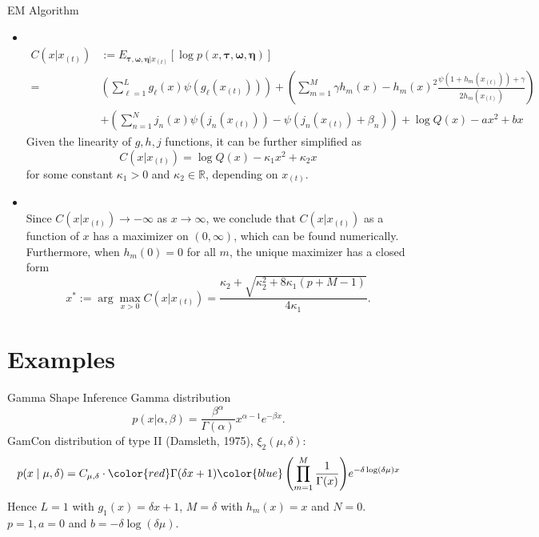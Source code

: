 \documentclass[10pt]{beamer}
\theoremstyle{remark}
\theoremstyle{definition}
\newcommand{\bcol}[1]{{\color{blue}{#1}}}
\begin{document}
\begin{frame}{EM Algorithm}
\footnotesize
\begin{itemize}
	\item \textbf{\bcol{Expectation Step:}}\\
	\begin{align*}
	C(x | x_{(t)}) &:= E_{\bm{\tau,\omega, \eta}|x_{(t)}}\left[\log p(x, \bm{\tau,\omega, \eta})\right] \\
	=& \left(\sum_{\ell=1}^L g_{\ell}(x) \psi(g_\ell(x_{(t)})) \right) + \left(\sum_{m=1}^M \gamma h_m(x) - h_m(x)^2 \frac{\psi(1+h_m(x_{(t)})) + \gamma}{2h_m(x_{(t)})} \right) \\
	&+ \left(\sum_{n=1}^N j_n(x)\psi(j_n(x_{(t)})) - \psi(j_n(x_{(t)}) + \beta_n) \right) + \log Q(x) -ax^2 + bx
	\end{align*}
	Given the linearity of $g, h, j$ functions, it can be further simplified as 
	\begin{equation*}
	C(x | x_{(t)}) = \log Q(x) - \kappa_1 x^2 + \kappa_2 x
	\end{equation*}
	for some constant $\kappa_1 > 0$ and $\kappa_2 \in \mathbb{R}$, depending on $x_{(t)}$.
	\item \textbf{\bcol{Maximization Step:}}\\
	Since $C(x | x_{(t)}) \rightarrow -\infty$ as $x \rightarrow \infty$,  we conclude that $C(x | x_{(t)})$ as a function of $x$ has a maximizer on $(0, \infty)$, which can be found numerically. Furthermore, when $h_m(0) = 0$ for all $m$, the unique maximizer has a closed form
	\begin{equation*}\label{eqn:m-step}
	x^* := \arg\max_{x>0} C(x | x_{(t)}) = \frac{\kappa_2 + \sqrt{\kappa_2^2 + 8\kappa_1(p+M-1)}}{4\kappa_1}.
	\end{equation*}
\end{itemize}
\end{frame}


\section{Examples}

\begin{frame}{Gamma Shape Inference}
Gamma distribution
$$
p(x|\alpha, \beta) = \frac{\beta^\alpha}{\Gamma(\alpha)} x^{\alpha-1} e^{-\beta x}.
$$
GamCon distribution of type II (Damsleth, 1975), $\xi_2(\mu, \delta)$:
\begin{equation*}
p(x \mid \mu, \delta) = C_{\mu,\delta}\cdot {\color{red}\Gamma(\delta x + 1)} {\color{blue}\left(\prod_{m=1}^M \frac{1}{\Gamma(x)}\right)} e^{-\delta\log(\delta\mu) x}
\end{equation*}
Hence $L=1$ with $g_1(x) = \delta x+ 1$, $M=\delta$ with $h_m(x) = x$ and $N=0$. $p=1, a=0$ and $b = -\delta\log(\delta\mu)$.
\end{frame}
\end{document}
